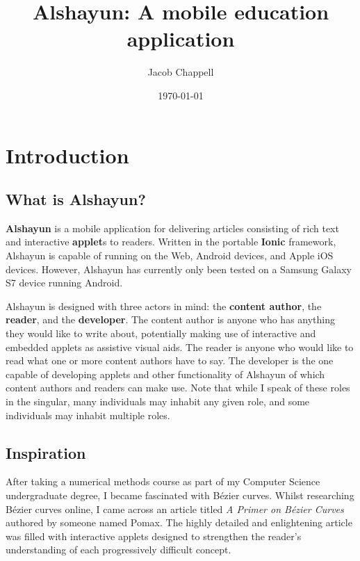 \documentclass[12pt]{report}
\begin{document}
\title{Alshayun: A mobile education application}
\author{Jacob Chappell}
\date{\today}
\maketitle

\tableofcontents


\chapter{Introduction}

    \section{What is Alshayun?}

\textbf{Alshayun} is a mobile application for delivering articles consisting of
rich text and interactive \textbf{applet}s to readers. Written in the portable
\textbf{Ionic} framework, Alshayun is capable of running on the Web, Android
devices, and Apple iOS devices. However, Alshayun has currently only been tested
on a Samsung Galaxy S7 device running Android.

Alshayun is designed with three actors in mind: the \textbf{content author}, the
\textbf{reader}, and the \textbf{developer}. The content author is anyone who
has anything they would like to write about, potentially making use of
interactive and embedded applets as assistive visual aids. The reader is anyone
who would like to read what one or more content authors have to say. The
developer is the one capable of developing applets and other functionality of
Alshayun of which content authors and readers can make use. Note that while I
speak of these roles in the singular, many individuals may inhabit any given
role, and some individuals may inhabit multiple roles.

    \section{Inspiration}

After taking a numerical methods course as part of my Computer Science
undergraduate degree, I became fascinated with Bézier curves. Whilst researching
Bézier curves online, I came across an article titled \textit{A Primer on Bézier
Curves} \cite{pomax} authored by someone named Pomax. The highly detailed and
enlightening article was filled with interactive applets designed to strengthen
the reader's understanding of each progressively difficult concept.
\end{document}
